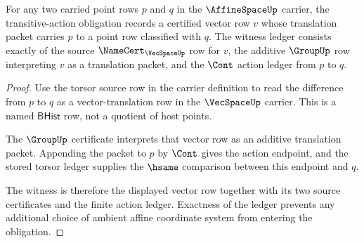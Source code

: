 \begin{theorem}
\label{thm:affinespace-transitive-action-obligation}
For any two carried point rows $p$ and $q$ in the $\AffineSpaceUp$ carrier, the transitive-action obligation records a certified vector row $v$ whose translation packet carries $p$ to a point row classified with $q$. The witness ledger consists exactly of the source $\NameCert_{\VecSpaceUp}$ row for $v$, the additive $\GroupUp$ row interpreting $v$ as a translation packet, and the $\Cont$ action ledger from $p$ to $q$.
\end{theorem}
\begin{proof}
Use the torsor source row in the carrier definition to read the difference from $p$ to $q$ as a vector-translation row in the $\VecSpaceUp$ carrier. This is a named $\mathsf{BHist}$ row, not a quotient of host points.

The $\GroupUp$ certificate interprets that vector row as an additive translation packet. Appending the packet to $p$ by $\Cont$ gives the action endpoint, and the stored torsor ledger supplies the $\hsame$ comparison between this endpoint and $q$.

The witness is therefore the displayed vector row together with its two source certificates and the finite action ledger. Exactness of the ledger prevents any additional choice of ambient affine coordinate system from entering the obligation.
\end{proof}

